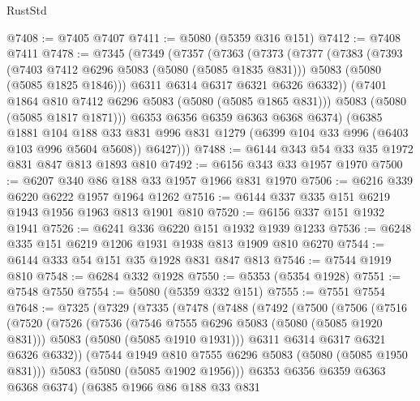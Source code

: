 \begin{lexlean}{RustStd}
\begin{coremodule}
@7408 := @7405 @7407
@7411 := @5080 (@5359 @316 @151)
@7412 := @7408 @7411
@7478 := @7345
    (@7349
      (@7357
        (@7363
          (@7373
            (@7377
              (@7383
                (@7393
                  (@7403 @7412 @6296 @5083 (@5080 (@5085 @1835 @831)))
                  @5083
                  (@5080 (@5085 @1825 @1846)))
                @6311
                @6314
                @6317
                @6321
                @6326
                @6332))
            (@7401 @1864 @810 @7412 @6296 @5083 (@5080 (@5085 @1865 @831)))
            @5083
            (@5080 (@5085 @1817 @1871)))
          @6353
          @6356
          @6359
          @6363
          @6368
          @6374)
        (@6385
          @1881
          @104
          @188
          @33
          @831
          @996
          @831
          @1279
          (@6399 @104 @33 @996 (@6403 @103 @996 @5604 @5608))
          @6427)))
@7488 := @6144 @343 @54 @33 @35 @1972 @831 @847 @813 @1893 @810
@7492 := @6156 @343 @33 @1957 @1970
@7500 := @6207 @340 @86 @188 @33 @1957 @1966 @831 @1970
@7506 := @6216 @339 @6220 @6222 @1957 @1964 @1262
@7516 := @6144 @337 @335 @151 @6219 @1943 @1956 @1963 @813 @1901 @810
@7520 := @6156 @337 @151 @1932 @1941
@7526 := @6241 @336 @6220 @151 @1932 @1939 @1233
@7536 := @6248 @335 @151 @6219 @1206 @1931 @1938 @813 @1909 @810 @6270
@7544 := @6144 @333 @54 @151 @35 @1928 @831 @847 @813
@7546 := @7544 @1919 @810
@7548 := @6284 @332 @1928
@7550 := @5353 (@5354 @1928)
@7551 := @7548 @7550
@7554 := @5080 (@5359 @332 @151)
@7555 := @7551 @7554
@7648 := @7325
    (@7329
      (@7335
        (@7478
          (@7488
            (@7492
              (@7500
                (@7506
                  (@7516
                    (@7520
                      (@7526
                        (@7536
                          (@7546 @7555 @6296 @5083 (@5080 (@5085 @1920 @831)))
                          @5083
                          (@5080 (@5085 @1910 @1931)))
                        @6311
                        @6314
                        @6317
                        @6321
                        @6326
                        @6332))
                    (@7544 @1949 @810 @7555 @6296 @5083 (@5080 (@5085 @1950 @831)))
                    @5083
                    (@5080 (@5085 @1902 @1956)))
                  @6353
                  @6356
                  @6359
                  @6363
                  @6368
                  @6374)
                (@6385
                  @1966
                  @86
                  @188
                  @33
                  @831

\end{coremodule}
\end{lexlean}
